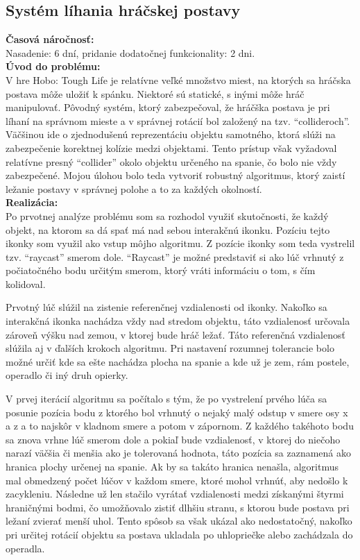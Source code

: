 \documentclass[slovak, bachelorpractice]{diploma}
\begin{document}
\subsection{Systém líhania hráčskej postavy}
\label{sec:sleep}
\textbf{Časová náročnosť:} \\ Nasadenie: 6 dní, pridanie dodatočnej funkcionality: 2 dni.\\
\textbf{Úvod do problému:} \\ V hre Hobo: Tough Life je relatívne veľké množstvo miest, na ktorých sa hráčska postava môže uložiť k spánku. Niektoré sú statické, s inými môže hráč manipulovať. Pôvodný systém, ktorý zabezpečoval, že hráčška postava je pri líhaní na správnom mieste a v správnej rotácií bol založený na tzv. \enquote{collideroch}. Väčšinou ide o zjednodušenú reprezentáciu objektu samotného, ktorá slúži na zabezpečenie korektnej kolízie medzi objektami. Tento prístup však vyžadoval relatívne presný \enquote{collider} okolo objektu určeného na spanie, čo bolo nie vždy zabezpečené. Mojou úlohou bolo teda vytvoriť robustný algoritmus, ktorý zaistí ležanie postavy v správnej polohe a to za každých okolností.  \\
\textbf{Realizácia:} \\ Po prvotnej analýze problému som sa rozhodol využiť skutočnosti, že každý objekt, na ktorom sa dá spať má nad sebou interakčnú ikonku. Pozíciu tejto ikonky som využil ako vstup môjho algoritmu. Z pozície ikonky som teda vystrelil tzv. \enquote{raycast} smerom dole. \enquote{Raycast} je možné predstaviť si ako lúč vrhnutý z počiatočného bodu určitým smerom, ktorý vráti informáciu o tom, s čím kolidoval.

Prvotný lúč slúžil na zistenie referenčnej vzdialenosti od ikonky. Nakoľko sa interakčná ikonka nachádza vždy nad stredom objektu, táto vzdialenosť určovala zároveň výšku nad zemou, v ktorej bude hráč ležať. Táto referenčná vzdialenosť slúžila aj v ďalších krokoch algoritmu. Pri nastavení rozumnej tolerancie bolo možné určiť kde sa ešte nachádza plocha na spanie a kde už je zem, rám postele, operadlo či iný druh opierky. 

V prvej iterácií algoritmu sa počítalo s tým, že po vystrelení prvého lúča sa posunie pozícia bodu z ktorého bol vrhnutý o nejaký malý odstup v smere osy x a z a to najskôr v kladnom smere a potom v zápornom. Z každého takéhoto bodu sa znova vrhne lúč smerom dole a pokiaľ bude vzdialenosť, v ktorej do niečoho narazí väčšia či menšia ako je tolerovaná hodnota, táto pozícia sa zaznamená ako hranica plochy určenej na spanie. Ak by sa takáto hranica nenašla, algoritmus mal obmedzený počet lúčov v každom smere, ktoré mohol vrhnúť, aby nedošlo k zacykleniu. Následne už len stačilo vyrátať vzdialenosti medzi získanými štyrmi hraničnými bodmi, čo umožňovalo zistiť dlhšiu stranu, s ktorou bude postava pri ležaní zvierať menší uhol. Tento spôsob sa však ukázal ako nedostatočný, nakoľko pri určitej rotácií objektu sa postava ukladala po uhlopriečke alebo zachádzala do operadla.
\end{document}

